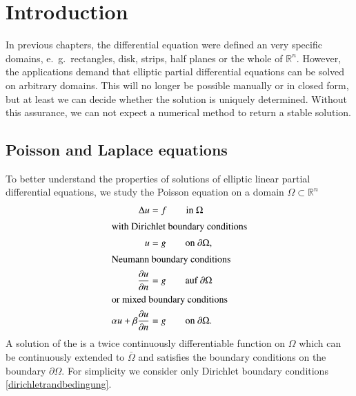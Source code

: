 %
%
%
\section{Introduction}
In previous chapters, the differential equation were defined an
very specific domains, e.~g.~rectangles, disk, strips, half planes or
the whole of $\mathbb R^n$.
However, the applications demand that elliptic partial differential
equations can be solved on arbitrary domains.
This will no longer be possible manually or in closed form, but at
least we can decide whether the solution is uniquely determined.
Without this assurance, we can not expect a numerical method to
return a stable solution.

\subsection{Poisson and Laplace equations}
To better understand the properties of solutions of elliptic linear
partial differential equations, we study the Poisson equation
on a domain $\Omega\subset\mathbb R^n$
\begin{align}
\Delta u&=f \qquad\text{in $\Omega$}
\label{elliptisch:poissonequation}
\\
\intertext{with Dirichlet boundary conditions}
u&=g \qquad \text{on $\partial\Omega$},
\label{dirichletrandbedingung}
\\
\intertext{Neumann boundary conditions}
\frac{\partial u}{\partial n}&=g \qquad \text{auf $\partial\Omega$}
\\
\intertext{or mixed boundary conditions}
\alpha u + \beta\frac{\partial u}{\partial n}&=g \qquad \text{on $\partial\Omega$.}
\label{elliptisch:gemischt}
\end{align}
A solution of the is a twice continuously differentiable function
on $\Omega$ which can be continuously extended to $\bar\Omega$
and satisfies the boundary conditions on the boundary $\partial\Omega$.
For simplicity we consider only Dirichlet boundary conditions
\eqref{dirichletrandbedingung}.

